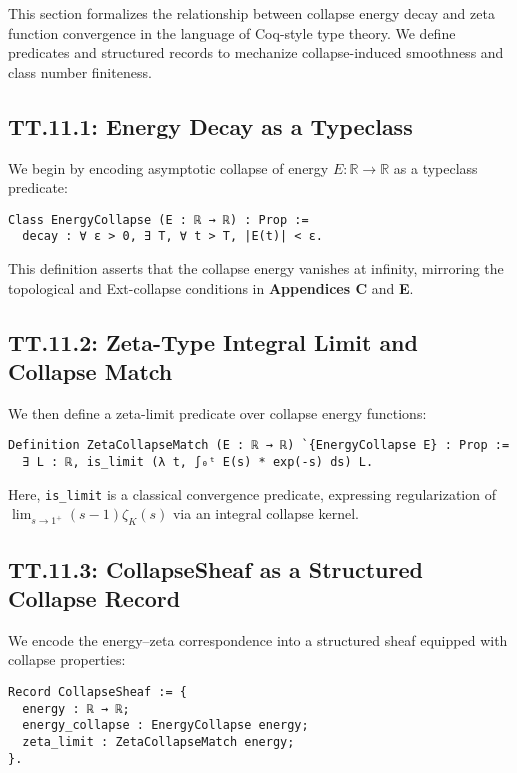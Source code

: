 \documentclass[11pt]{article}
\begin{document}
{This section formalizes the relationship between collapse energy decay and zeta function convergence  
in the language of Coq-style type theory. We define predicates and structured records to mechanize  
collapse-induced smoothness and class number finiteness.

\subsection*{TT.11.1: Energy Decay as a Typeclass}

We begin by encoding asymptotic collapse of energy \( E : \mathbb{R} \to \mathbb{R} \) as a typeclass predicate:

\begin{verbatim}
Class EnergyCollapse (E : ℝ → ℝ) : Prop :=
  decay : ∀ ε > 0, ∃ T, ∀ t > T, |E(t)| < ε.
\end{verbatim}

This definition asserts that the collapse energy vanishes at infinity,  
mirroring the topological and Ext-collapse conditions in \textbf{Appendices C} and \textbf{E}.

\subsection*{TT.11.2: Zeta-Type Integral Limit and Collapse Match}

We then define a zeta-limit predicate over collapse energy functions:

\begin{verbatim}
Definition ZetaCollapseMatch (E : ℝ → ℝ) `{EnergyCollapse E} : Prop :=
  ∃ L : ℝ, is_limit (λ t, ∫₀ᵗ E(s) * exp(-s) ds) L.
\end{verbatim}

Here, \texttt{is\_limit} is a classical convergence predicate,  
expressing regularization of \( \lim_{s \to 1^+} (s-1)\zeta_K(s) \) via an integral collapse kernel.

\subsection*{TT.11.3: CollapseSheaf as a Structured Collapse Record}

We encode the energy–zeta correspondence into a structured sheaf equipped with collapse properties:

\begin{verbatim}
Record CollapseSheaf := {
  energy : ℝ → ℝ;
  energy_collapse : EnergyCollapse energy;
  zeta_limit : ZetaCollapseMatch energy;
}.
\end{verbatim}

}
\end{document}
